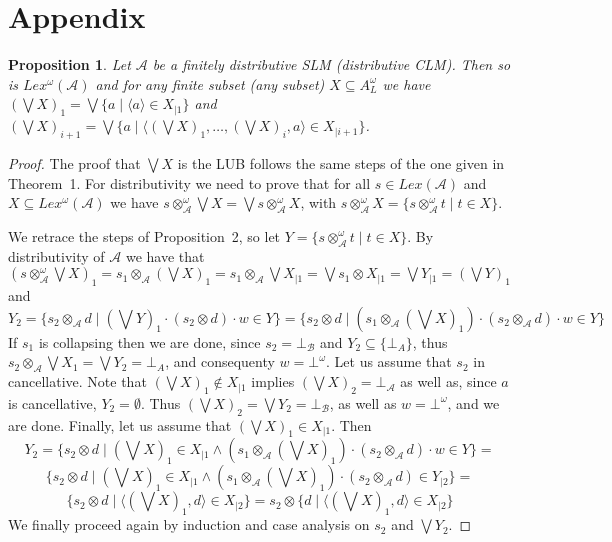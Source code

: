 \documentclass[a4paper]{elsarticle}
\newtheorem{proposition}{Proposition}
\newcommand{\1}{\mathbf{1}}
\begin{document}
\section*{Appendix}
\begin{proposition}\label{prop:lexiSLM}
	Let $\mathcal{A}$ be a finitely distributive SLM (distributive CLM).
	Then so is $Lex^\omega(\mathcal{A})$
	and for any finite subset (any subset) $X \subseteq A^\omega_L$ 
	we have $(\bigvee X)_1 = \bigvee \{ a \mid \langle a \rangle \in X_{\mid 1}\}$
	and $(\bigvee X)_{i+1} = \bigvee \{ a \mid \langle (\bigvee X)_1, \ldots, (\bigvee X)_i, a \rangle \in X_{\mid i+1}\}$.
\end{proposition}
\begin{proof}
	The proof that $\bigvee X$ is the LUB follows the same steps of the one given in 
	Theorem~1.
	For distributivity we need to prove that for all $s \in Lex(\mathcal{A})$ and 
	$X \subseteq Lex^\omega(\mathcal{A})$ we have $s \otimes^\omega_\mathcal{A} \bigvee X = \bigvee s \otimes^\omega_\mathcal{A} X$, 
	with $s \otimes^\omega_\mathcal{A} X = \{ s \otimes^\omega_\mathcal{A} t \mid t \in X\}$.
	
	We retrace the steps of Proposition~2,
	so let $Y = \{ s \otimes^\omega_\mathcal{A} t \mid t \in X\}$.
	By distributivity of $\mathcal{A}$ we have that
	$(s \otimes^\omega_\mathcal{A} \bigvee X)_1 = s_1 \otimes_\mathcal{A} (\bigvee X)_1 = s_1 \otimes_\mathcal{A} \bigvee X_{\mid 1}
	= \bigvee s_1 \otimes X_{\mid 1} =  \bigvee Y_{\mid 1} = (\bigvee Y)_1$ and
	$$Y_2 = \{ s_2 \otimes_\mathcal{A} d \mid (\bigvee Y)_{1} \cdot (s_2 \otimes d) \cdot w \in Y\}
	= \{  s_2 \otimes d \mid (s_1 \otimes_\mathcal{A} (\bigvee X)_{1}) \cdot (s_2 \otimes_\mathcal{A} d) \cdot w \in Y \}$$
	If $s_1$ is collapsing then we are done, since $s_2 = \bot_\mathcal{B}$ and $Y_2 \subseteq \{\bot_{A}\}$,
	thus $s_2 \otimes_\mathcal{A} \bigvee X_1 = 
	\bigvee Y_2 = \bot_{A}$, and consequenty $w = \bot^\omega$.
	Let us assume that $s_2$ in cancellative.
	Note that $(\bigvee X)_1 \not \in X_{\mid 1}$ implies $(\bigvee X)_2 = \bot_{\mathcal A}$ as well as, 
	since $a$ is cancellative, $Y_2 = \emptyset$.
	Thus $(\bigvee X)_2 = \bigvee Y_2 =\bot_\mathcal{B}$, as well as 
	$w = \bot^\omega$, and we are done.
	Finally, let us assume that $(\bigvee X)_1 \in X_{\mid 1}$. Then
	$$Y_2 = \{  s_2 \otimes d \mid (\bigvee X)_1 \in X_{\mid 1} \wedge (s_1 \otimes_\mathcal{A} (\bigvee X)_{1}) \cdot (s_2 \otimes_\mathcal{A} d) \cdot w \in Y \}
	=  $$
	$$\{  s_2 \otimes d \mid (\bigvee X)_1 \in X_{\mid 1} \wedge (s_1 \otimes_\mathcal{A} (\bigvee X)_{1}) \cdot (s_2 \otimes_\mathcal{A} d) \in Y _{\mid 2} \}
	=$$
	$$\{  s_2 \otimes d \mid \langle (\bigvee X)_1, d \rangle \in X _{\mid 2} \}
	= s_2 \otimes \{ d \mid \langle (\bigvee X)_1,  d \rangle \in X _{\mid 2} \}$$
	We finally proceed again by induction and case analysis on $s_2$ and $\bigvee Y_2$.
\end{proof}
\end{document}
